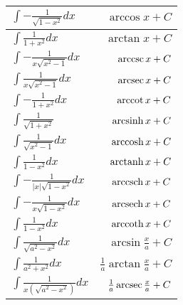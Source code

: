 \begin{center}
\begin{tabular}{l|r}
$\displaystyle{\int} -\frac{1}{\sqrt{1-x^{2}}} dx$    & $\arccos{x} + C$\\ \hline

$\displaystyle{\int} \frac{1}{1+x^{2}} dx$            & $\arctan{x} + C$\\ \hline

$\displaystyle{\int} -\frac{1}{x\sqrt{x^{2}-1}} dx$   & $\operatorname{arccsc}{x} + C$\\ \hline

$\displaystyle{\int} \frac{1}{x\sqrt{x^{2}-1}} dx$    & $\operatorname{arcsec}{x} + C$\\ \hline

$\displaystyle{\int} -\frac{1}{1+x^{2}} dx$           & $\operatorname{arccot}{x} + C$\\ \hline

$\displaystyle{\int} \frac{1}{\sqrt{1+x^{2}}}$        & $\operatorname{arcsinh}{x} + C$\\ \hline

$\displaystyle{\int} \frac{1}{\sqrt{x^{2}-1}} dx$     & $\operatorname{arccosh}{x} + C$\\ \hline

$\displaystyle{\int} \frac{1}{1-x^{2}} dx$            & $\operatorname{arctanh}{x} + C$\\ \hline

$\displaystyle{\int} -\frac{1}{|x|\sqrt{1-x^{2}}} dx$ & $\operatorname{arccsch}{x} + C$\\ \hline

$\displaystyle{\int} -\frac{1}{x\sqrt{1-x^{2}}} dx$   & $\operatorname{arcsech}{x} + C$\\ \hline

$\displaystyle{\int} \frac{1}{1-x^{2}} dx$            & $\operatorname{arccoth}{x} + C$\\ \hline

$\displaystyle{\int} \frac{1}{\sqrt{a^{2} - x^{2}}} dx$ & $\arcsin{\frac{x}{a}} + C$ \\ \hline

$\displaystyle{\int} \frac{1}{a^{2} + x^{2}} dx$      & $ \frac{1}{a}\arctan{\frac{x}{a}} + C$ \\ \hline
$\displaystyle{\int} \frac{1}{x(\sqrt{a^{2} - x^{2}})} dx$ & $ \frac{1}{a}\operatorname{arcsec}{\frac{x}{a}} + C$ \\ \hline %


\end{tabular}

\end{center}



